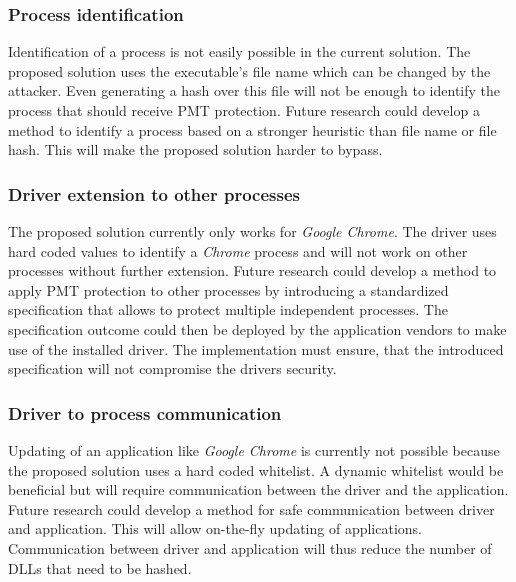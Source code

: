 \subsubsection{Process identification}
Identification of a process is not easily possible in the current solution. The proposed solution uses the executable's file name which can be changed by the attacker. Even generating a hash over this file will not be enough to identify the process that should receive \gls{PMT} protection. Future research could develop a method to identify a process based on a stronger heuristic than file name or file hash. This will make the proposed solution harder to bypass.
\subsubsection{Driver extension to other processes}
The proposed solution currently only works for \emph{Google Chrome}. The driver uses hard coded values to identify a \emph{Chrome} process and will not work on other processes without further extension. Future research could develop a method to apply \gls{PMT} protection to other processes by introducing a standardized specification that allows to protect multiple independent processes. The specification outcome could then be deployed by the application vendors to make use of the installed driver. The implementation must ensure, that the introduced specification will not compromise the drivers security.
\subsubsection{Driver to process communication}
Updating of an application like \emph{Google Chrome} is currently not possible because the proposed solution uses a hard coded whitelist. A dynamic whitelist would be beneficial but will require communication between the driver and the application. Future research could develop a method for safe communication between driver and application. This will allow on-the-fly updating of applications. Communication between driver and application will thus reduce the number of \glspl{DLL} that need to be hashed.